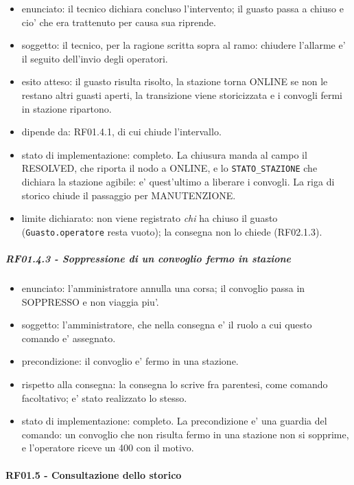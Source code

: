 \documentclass[11pt]{article}
\begin{document}
\label{sec:orgdae8fe5}
\begin{itemize}
\item enunciato: il tecnico dichiara concluso l'intervento; il guasto passa a chiuso e cio' che era
trattenuto per causa sua riprende.
\item soggetto: il tecnico, per la ragione scritta sopra al ramo: chiudere l'allarme e' il seguito
dell'invio degli operatori.
\item esito atteso: il guasto risulta risolto, la stazione torna ONLINE se non le restano altri guasti
aperti, la transizione viene storicizzata e i convogli fermi in stazione ripartono.
\item dipende da: RF01.4.1, di cui chiude l'intervallo.
\item stato di implementazione: completo. La chiusura manda al campo il RESOLVED, che riporta il nodo a
ONLINE, e lo \texttt{STATO\_STAZIONE} che dichiara la stazione agibile: e' quest'ultimo a liberare i
convogli. La riga di storico chiude il passaggio per MANUTENZIONE.
\item limite dichiarato: non viene registrato \emph{chi} ha chiuso il guasto (\texttt{Guasto.operatore} resta
vuoto); la consegna non lo chiede (RF02.1.3).
\end{itemize}
\subparagraph{RF01.4.3 - Soppressione di un convoglio fermo in stazione}
\label{sec:orgb2b4286}
\begin{itemize}
\item enunciato: l'amministratore annulla una corsa; il convoglio passa in SOPPRESSO e non viaggia piu'.
\item soggetto: l'amministratore, che nella consegna e' il ruolo a cui questo comando e' assegnato.
\item precondizione: il convoglio e' fermo in una stazione.
\item rispetto alla consegna: la consegna lo scrive fra parentesi, come comando facoltativo; e' stato
realizzato lo stesso.
\item stato di implementazione: completo. La precondizione e' una guardia del comando: un convoglio che
non risulta fermo in una stazione non si sopprime, e l'operatore riceve un 400 con il motivo.
\end{itemize}
\paragraph{RF01.5 - Consultazione dello storico}
\label{sec:org880953e}
\end{document}
